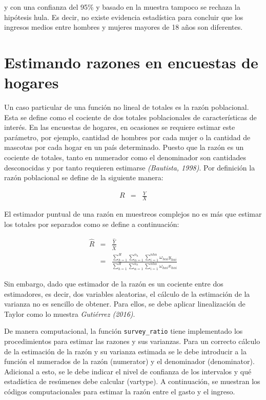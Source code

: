 \documentclass[
  12pt,
]{book}
\begin{document}
y con una confianza del 95\% y basado en la muestra tampoco se rechaza la hipótesis hula. Es decir, no existe evidencia estadística para concluir que los ingresos medios entre hombres y mujeres mayores de 18 años son diferentes.

\hypertarget{estimando-razones-en-encuestas-de-hogares}{%
\section{Estimando razones en encuestas de hogares}\label{estimando-razones-en-encuestas-de-hogares}}

Un caso particular de una función no lineal de totales es la razón poblacional. Esta se define como el cociente de dos totales poblacionales de características de interés. En las encuestas de hogares, en ocasiones se requiere estimar este parámetro, por ejemplo, cantidad de hombres por cada mujer o la cantidad de mascotas por cada hogar en un país determinado. Puesto que la razón es un cociente de totales, tanto en numerador como el denominador son cantidades desconocidas y por tanto requieren estimarse \emph{(Bautista, 1998)}. Por definición la razón poblacional se define de la siguiente manera:

\begin{eqnarray*}
R & = & \frac{Y}{X}
\end{eqnarray*}

El estimador puntual de una razón en muestreos complejos no es más que estimar los totales por separados como se define a continuación:

\begin{eqnarray*}
\hat{R} & = & \frac{\hat{Y}}{\hat{X}}\\
 & = & \frac{{ \sum_{h=1}^{H}\sum_{\alpha=1}^{\alpha_{h}}\sum_{i=1}^{nh\alpha}}\omega_{h\alpha i}y_{h\alpha i}}{{ \sum_{h=1}^{H}\sum_{\alpha=1}^{\alpha_{h}}\sum_{i=1}^{nh\alpha}}\omega_{h\alpha i}x_{h\alpha i}}
\end{eqnarray*}

Sin embargo, dado que estimador de la razón es un cociente entre dos estimadores, es decir, dos variables aleatorias, el cálculo de la estimación de la varianza no es sencillo de obtener. Para ellos, se debe aplicar linealización de Taylor como lo muestra \emph{Gutiérrez (2016)}.

De manera computacional, la función \texttt{survey\_ratio} tiene implementado los procedimientos para estimar las razones y sus varianzas. Para un correcto cálculo de la estimación de la razón y su varianza estimada se le debe introducir a la función el numerados de la razón (numerator) y el denominador (denominator). Adicional a esto, se le debe indicar el nivel de confianza de los intervalos y qué estadística de resúmenes debe calcular (vartype). A continuación, se muestran los códigos computacionales para estimar la razón entre el gasto y el ingreso.
\end{document}
